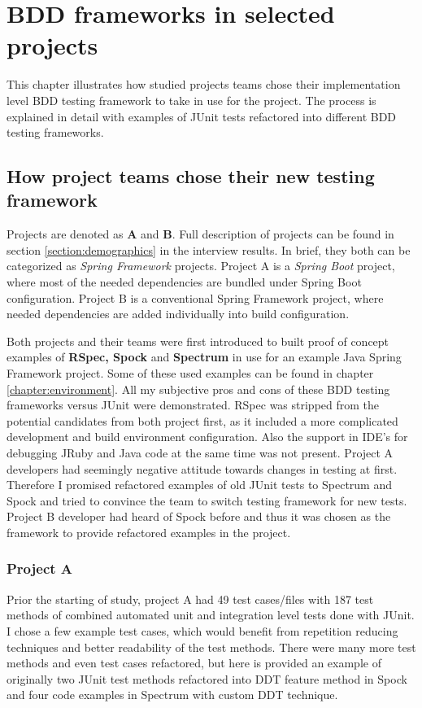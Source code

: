\chapter{BDD frameworks in selected projects}
\label{chapter:projects}

This chapter illustrates how studied projects teams chose their implementation level BDD testing
framework to take in use for the project. The process is explained in detail with examples of JUnit tests
refactored into different BDD testing frameworks.

\section{How project teams chose their new testing framework}
\label{section:teams}
    Projects are denoted as \textbf{A} and \textbf{B}. Full description of projects can be found in section \ref{section:demographics} in the interview
    results. In brief, they both can be categorized as \textit{Spring Framework} projects. Project A is a \textit{Spring Boot} project, where
    most of the needed dependencies are bundled under Spring Boot configuration. Project B is a conventional Spring Framework project,
    where needed dependencies are added individually into build configuration.

    Both projects and their teams were first introduced to built proof of concept examples of \textbf{RSpec, Spock} and \textbf{Spectrum}
    in use for an example Java Spring Framework project. Some of these used examples can be found in chapter \ref{chapter:environment}.
    All my subjective pros and cons of these BDD testing frameworks versus JUnit were demonstrated. RSpec was stripped from the
    potential candidates from both project first, as it included a more complicated development and build environment configuration. Also
    the support in IDE's for debugging JRuby and Java code at the same time was not present. Project A developers had
    seemingly negative attitude towards changes in testing at first. Therefore I promised refactored examples of old JUnit
    tests to Spectrum and Spock and tried to convince the team to switch testing framework for new tests.
    Project B developer had heard of Spock before and thus it was chosen as the framework to provide refactored examples in the project.

    \subsection{Project A}
    Prior the starting of study, project A had 49 test cases/files with 187 test methods of combined automated unit and integration level tests done with JUnit.
    I chose a few example test cases, which would benefit from repetition reducing techniques and better readability of the test methods.
    There were many more test methods and even test cases refactored, but here is provided an example of originally two JUnit
    test methods refactored into DDT feature method in Spock and four code examples in Spectrum with custom DDT technique.

